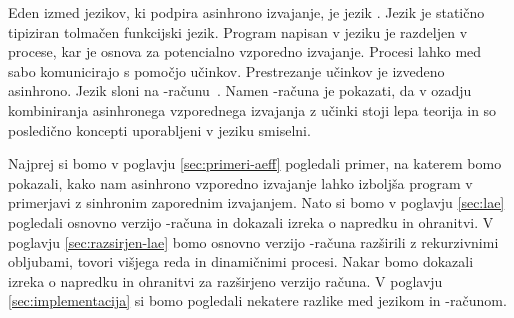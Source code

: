 Eden izmed jezikov, ki podpira asinhrono izvajanje, je jezik \aeff{}. Jezik \aeff{} je statično tipiziran tolmačen funkcijski jezik. Program napisan v jeziku \aeff{} je razdeljen v procese, kar je osnova za potencialno vzporedno izvajanje. Procesi lahko med sabo komunicirajo s pomočjo učinkov. Prestrezanje učinkov je izvedeno asinhrono.
Jezik \aeff{} sloni na \lae{}-računu~\cite{aeff}. Namen \lae{}-računa je pokazati, da v ozadju kombiniranja asinhronega vzporednega izvajanja z učinki stoji lepa teorija in so posledično koncepti uporabljeni v jeziku \aeff{} smiselni.

Najprej si bomo v poglavju \ref{sec:primeri-aeff} pogledali primer, na katerem bomo pokazali, kako nam asinhrono vzporedno izvajanje lahko izboljša program v primerjavi z sinhronim zaporednim izvajanjem.
Nato si bomo v poglavju \ref{sec:lae} pogledali osnovno verzijo \lae{}-računa in dokazali izreka o napredku in ohranitvi. V poglavju \ref{sec:razsirjen-lae} bomo osnovno verzijo \lae{}-računa razširili z rekurzivnimi obljubami, tovori višjega reda in dinamičnimi procesi. Nakar bomo dokazali izreka o napredku in ohranitvi za razširjeno verzijo računa. V poglavju \ref{sec:implementacija} si bomo pogledali nekatere razlike med jezikom \aeff{} in \lae{}-računom.